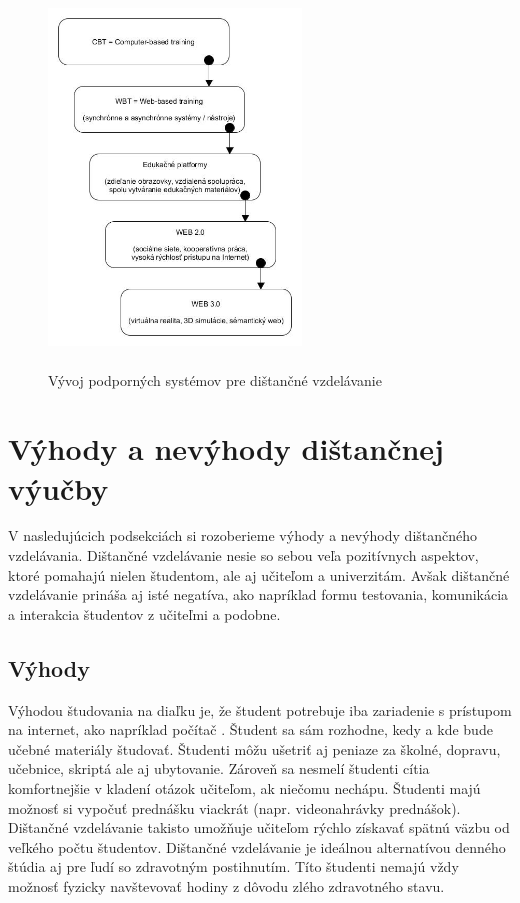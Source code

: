 \documentclass[10pt,oneside,slovak,a4paper]{article}
\begin{document}
\begin{figure}[h]
	\centering
	\includegraphics[scale=0.15, height=100mm,width=0.6\textwidth]{Dev_Of_SupSys_DE.jpg}
	\caption{Vývoj podporných systémov pre dištančné vzdelávanie\cite{WiktorzakKotowski}}
	\label{Vyvoj_podp_sys_DE}
\end{figure}

\section{Výhody a nevýhody dištančnej výučby}
V nasledujúcich podsekciách si rozoberieme výhody a nevýhody dištančného vzdelávania\cite{Sokolova2018}.
Dištančné vzdelávanie nesie so sebou veľa pozitívnych aspektov, ktoré pomahajú nielen študentom, ale aj učiteľom a univerzitám.
Avšak dištančné vzdelávanie prináša aj isté negatíva, ako napríklad formu testovania, komunikácia a interakcia študentov z učiteľmi a podobne. 

\subsection{Výhody}
Výhodou študovania na diaľku je, že študent potrebuje iba zariadenie s prístupom na internet, ako napríklad počítač \cite{Sokolova2018}.
Študent sa sám rozhodne, kedy a kde bude učebné materiály študovať. Študenti môžu ušetriť aj peniaze za školné, dopravu, učebnice, skriptá ale aj ubytovanie.
Zároveň sa nesmelí študenti cítia komfortnejšie v kladení otázok učiteľom, ak niečomu nechápu. Študenti majú možnosť si vypočuť prednášku viackrát (napr. videonahrávky prednášok).
Dištančné vzdelávanie takisto umožňuje učiteľom rýchlo získavať spätnú väzbu od veľkého počtu študentov.
Dištančné vzdelávanie je ideálnou alternatívou denného štúdia aj pre ľudí so zdravotným postihnutím.
Títo študenti nemajú vždy možnosť fyzicky navštevovať hodiny z dôvodu zlého zdravotného stavu.
\end{document}
